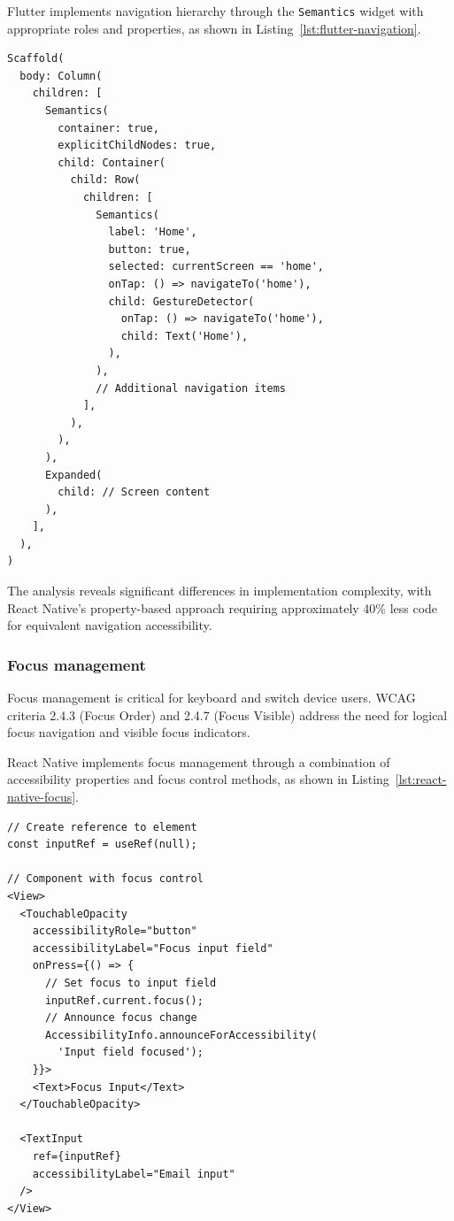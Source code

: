 Flutter implements navigation hierarchy through the \texttt{Semantics} widget with appropriate roles and properties, as shown in Listing~\ref{lst:flutter-navigation}.

\begin{lstlisting}[style=DartStyle, caption=Navigation hierarchy in Flutter, label=lst:flutter-navigation]
Scaffold(
  body: Column(
    children: [
      Semantics(
        container: true,
        explicitChildNodes: true,
        child: Container(
          child: Row(
            children: [
              Semantics(
                label: 'Home',
                button: true,
                selected: currentScreen == 'home',
                onTap: () => navigateTo('home'),
                child: GestureDetector(
                  onTap: () => navigateTo('home'),
                  child: Text('Home'),
                ),
              ),
              // Additional navigation items
            ],
          ),
        ),
      ),
      Expanded(
        child: // Screen content
      ),
    ],
  ),
)
\end{lstlisting}

The analysis reveals significant differences in implementation complexity, with React Native's property-based approach requiring approximately 40\% less code for equivalent navigation accessibility.

\subsubsection{Focus management}
\label{subsubsec:focus-management}

Focus management is critical for keyboard and switch device users. WCAG criteria 2.4.3 (Focus Order) and 2.4.7 (Focus Visible) address the need for logical focus navigation and visible focus indicators.

React Native implements focus management through a combination of accessibility properties and focus control methods, as shown in Listing~\ref{lst:react-native-focus}.

\begin{lstlisting}[style=ReactNativeStyle, caption=Focus management in React Native, label=lst:react-native-focus]
// Create reference to element
const inputRef = useRef(null);

// Component with focus control
<View>
  <TouchableOpacity
    accessibilityRole="button"
    accessibilityLabel="Focus input field"
    onPress={() => {
      // Set focus to input field
      inputRef.current.focus();
      // Announce focus change
      AccessibilityInfo.announceForAccessibility(
        'Input field focused');
    }}>
    <Text>Focus Input</Text>
  </TouchableOpacity>
  
  <TextInput
    ref={inputRef}
    accessibilityLabel="Email input"
  />
</View>
\end{lstlisting}

